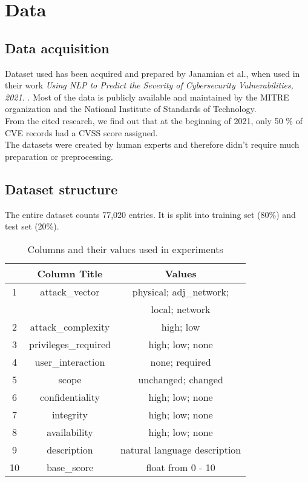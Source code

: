 \documentclass[times, utf8, zavrsni, english]{fer}
\begin{document}
\chapter{Data}
\section{Data acquisition}
Dataset used has been acquired and prepared by Janamian et al., when used in their work \emph{Using NLP to Predict the Severity of Cybersecurity Vulnerabilities, 2021.} \citep{vulnerwatch}.
Most of the data is publicly available and maintained by the MITRE organization and the National Institute of Standards of Technology. \\
From the cited research, we find out that at the beginning of 2021, only 50 \% of CVE records had a CVSS score assigned. \\
The datasets were created by human experts and therefore didn't require much preparation or preprocessing. 

\section{Dataset structure}
The entire dataset counts 77,020 entries. It is split into training set (80\%) and test set (20\%).

\begin{table}[h!]
	\centering
	\begin{tabular}{||c c c ||} 
		\hline
		 & Column Title & Values  \\ [0.5ex] 
		\hline\hline
		
		1 & attack\_vector & physical; adj\_network;   \\
		 & &  local; network \\
		2 & attack\_complexity & high; low  \\
		3 & privileges\_required & high; low; none  \\
		4 & user\_interaction & none; required \\ 
		5 & scope & unchanged; changed \\ 
		6 & confidentiality & high; low; none  \\
		7 & integrity & high; low; none  \\
		8 & availability & high; low; none  \\
		
		\hline\hline
		9 & description & natural language description \\
		10 & base\_score & float from 0 - 10 \\
		\hline
	\end{tabular}
\caption{Columns and their values used in experiments}
\label{table:1}
\end{table}
\end{document}
